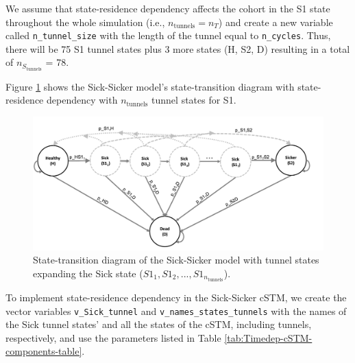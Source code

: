 \documentclass[
]{article}
\begin{document}
We assume that state-residence dependency affects the cohort in the S1 state throughout the whole simulation (i.e., \(n_{\text{tunnels}}=n_T\)) and create a new variable called \texttt{n\_tunnel\_size} with the length of the tunnel equal to \texttt{n\_cycles}. Thus, there will be 75 S1 tunnel states plus 3 more states (H, S2, D) resulting in a total of \(n_{S_{\text{tunnels}}}\) = 78.

Figure \ref{fig:STD-Sick-Sicker-tunnels} shows the Sick-Sicker model's state-transition diagram with state-residence dependency with \(n_{\text{tunnels}}\) tunnel states for S1.

\begin{figure}[H]

{\centering \includegraphics[width=1\linewidth]{figs/Sick-Sicker-with-tunnels} 

}

\caption{State-transition diagram of the Sick-Sicker model with tunnel states expanding the Sick state ($S1_1, S1_2,...,S1_{n_{\text{tunnels}}}$).}\label{fig:STD-Sick-Sicker-tunnels}
\end{figure}

To implement state-residence dependency in the Sick-Sicker cSTM, we create the vector variables \texttt{v\_Sick\_tunnel} and \texttt{v\_names\_states\_tunnels} with the names of the Sick tunnel states' and all the states of the cSTM, including tunnels, respectively, and use the parameters listed in Table \ref{tab:Timedep-cSTM-components-table}.
\end{document}
